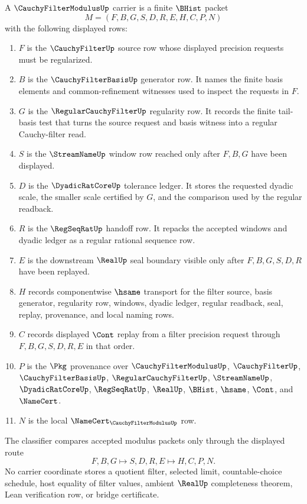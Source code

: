 \begin{definition}
\label{def:cauchy-filter-modulus-carrier}
A $\CauchyFilterModulusUp$ carrier is a finite $\BHist$ packet
$$
M=(F,B,G,S,D,R,E,H,C,P,N)
$$
with the following displayed rows:
\begin{enumerate}
\item $F$ is the $\CauchyFilterUp$ source row whose displayed precision requests must be regularized.
\item $B$ is the $\CauchyFilterBasisUp$ generator row. It names the finite basis elements and common-refinement witnesses used to inspect the requests in $F$.
\item $G$ is the $\RegularCauchyFilterUp$ regularity row. It records the finite tail-basis test that turns the source request and basis witness into a regular Cauchy-filter read.
\item $S$ is the $\StreamNameUp$ window row reached only after $F,B,G$ have been displayed.
\item $D$ is the $\DyadicRatCoreUp$ tolerance ledger. It stores the requested dyadic scale, the smaller scale certified by $G$, and the comparison used by the regular readback.
\item $R$ is the $\RegSeqRatUp$ handoff row. It repacks the accepted windows and dyadic ledger as a regular rational sequence row.
\item $E$ is the downstream $\RealUp$ seal boundary visible only after $F,B,G,S,D,R$ have been replayed.
\item $H$ records componentwise $\hsame$ transport for the filter source, basis generator, regularity row, windows, dyadic ledger, regular readback, seal, replay, provenance, and local naming rows.
\item $C$ records displayed $\Cont$ replay from a filter precision request through $F,B,G,S,D,R,E$ in that order.
\item $P$ is the $\Pkg$ provenance over $\CauchyFilterModulusUp$, $\CauchyFilterUp$, $\CauchyFilterBasisUp$, $\RegularCauchyFilterUp$, $\StreamNameUp$, $\DyadicRatCoreUp$, $\RegSeqRatUp$, $\RealUp$, $\BHist$, $\hsame$, $\Cont$, and $\NameCert$.
\item $N$ is the local $\NameCert_{\CauchyFilterModulusUp}$ row.
\end{enumerate}
The classifier compares accepted modulus packets only through the displayed route
$$
F,B,G \longmapsto S,D,R,E \longmapsto H,C,P,N .
$$
No carrier coordinate stores a quotient filter, selected limit, countable-choice schedule, host equality of filter values, ambient $\RealUp$ completeness theorem, Lean verification row, or bridge certificate.
\end{definition}

